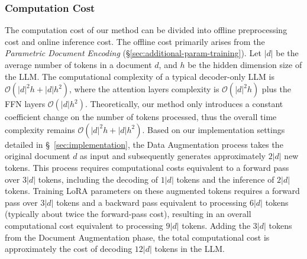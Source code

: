 \documentclass[sigconf,natbib=true,anonymous=false]{acmart}
\begin{document}
\subsubsection{Computation Cost}
The computation cost of our method can be divided into offline preprocessing cost and online inference cost.
The offline cost primarily arises from the \textit{Parametric Document Encoding} (\S\ref{sec:additional-param-training}). 
Let $|d|$ be the average number of tokens in a document $d$, and \(h\) be the hidden dimension size of the LLM. 
The computational complexity of a typical decoder-only LLM is $\mathcal{O}(|d|^2h+|d|h^2)$, where the attention layers complexity is $\mathcal{O}(|d|^2h)$ plus the FFN layers $\mathcal{O}(|d|h^2)$.
Theoretically, our method only introduces a constant coefficient change on the number of tokens processed, thus the overall time complexity remains $\mathcal{O}(|d|^2h+|d|h^2)$.
Based on our implementation settings detailed in \S ~\ref{sec:implementation}, the Data Augmentation process takes the original document \( d \) as input and subsequently generates approximately \( 2|d| \) new tokens. 
This process requires computational costs equivalent to a forward pass over \( 3|d| \) tokens, including the decoding of \( 1|d| \) tokens and the inference of \( 2|d| \) tokens.
Training LoRA parameters on these augmented tokens requires a forward pass over $3|d|$ tokens and a backward pass equivalent to processing $6|d|$ tokens (typically about twice the forward-pass cost), resulting in an overall computational cost equivalent to processing $9|d|$ tokens. 
Adding the $3|d|$ tokens from the Document Augmentation phase, the total computational cost is approximately the cost of decoding $12|d|$ tokens in the LLM.



\end{document}
